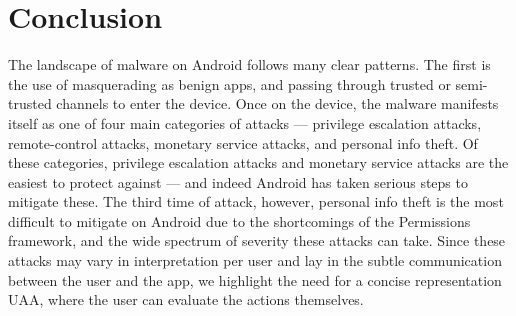 \section{Conclusion}
The landscape of malware on Android follows many clear patterns. The first is the use of masquerading as benign apps, and passing through trusted or semi-trusted channels to enter the device. Once on the device, the malware manifests itself as one of four main categories of attacks --- privilege escalation attacks, remote-control attacks, monetary service attacks, and personal info theft. Of these categories, privilege escalation attacks and monetary service attacks are the easiest to protect against --- and indeed Android has taken serious steps to mitigate these. The third time of attack, however, personal info theft is the most difficult to mitigate on Android due to the shortcomings of the Permissions framework, and the wide spectrum of severity these attacks can take. Since these attacks may vary in interpretation per user and lay in the subtle communication between the user and the app, we highlight the need for a concise representation UAA, where the user can evaluate the actions themselves.
